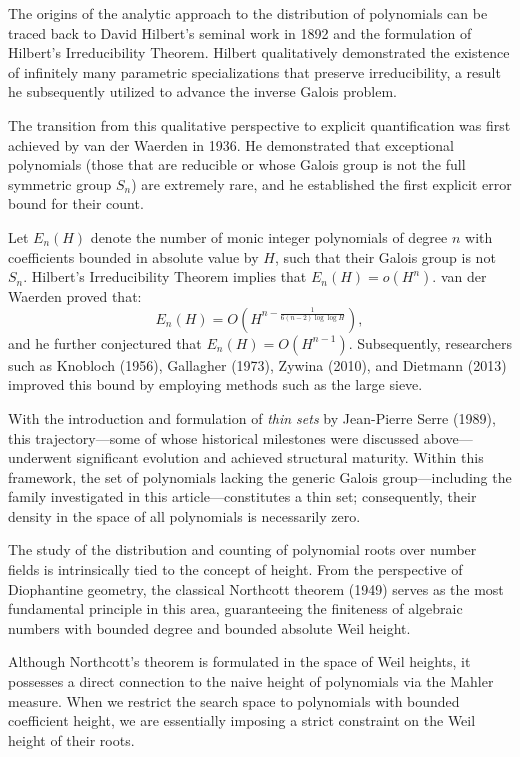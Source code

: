 \documentclass[11pt,a4paper]{article}
\begin{document}
The origins of the analytic approach to the distribution of polynomials can be traced back to David Hilbert's seminal work in 1892 and the formulation of Hilbert's Irreducibility Theorem. Hilbert qualitatively demonstrated the existence of infinitely many parametric specializations that preserve irreducibility, a result he subsequently utilized to advance the inverse Galois problem.

The transition from this qualitative perspective to explicit quantification was first achieved by van der Waerden in 1936. He demonstrated that exceptional polynomials (those that are reducible or whose Galois group is not the full symmetric group $S_n$) are extremely rare, and he established the first explicit error bound for their count.

Let $E_n(H)$ denote the number of monic integer polynomials of degree $n$ with coefficients bounded in absolute value by $H$, such that their Galois group is not $S_n$. Hilbert's Irreducibility Theorem implies that $E_n(H) = o(H^n)$. van der Waerden proved that:
\begin{equation*}
    E_n(H) = O\left( H^{n - \frac{1}{6(n-2)\log\log H}} \right),
\end{equation*}
and he further conjectured that $E_n(H) = O(H^{n-1})$. Subsequently, researchers such as Knobloch (1956), Gallagher (1973), Zywina (2010), and Dietmann (2013) improved this bound by employing methods such as the large sieve.

With the introduction and formulation of \textit{thin sets} by Jean-Pierre Serre (1989), this trajectory---some of whose historical milestones were discussed above---underwent significant evolution and achieved structural maturity. Within this framework, the set of polynomials lacking the generic Galois group---including the family investigated in this article---constitutes a thin set; consequently, their density in the space of all polynomials is necessarily zero.

The study of the distribution and counting of polynomial roots over number fields is intrinsically tied to the concept of height. From the perspective of Diophantine geometry, the classical Northcott theorem (1949) serves as the most fundamental principle in this area, guaranteeing the finiteness of algebraic numbers with bounded degree and bounded absolute Weil height.

Although Northcott's theorem is formulated in the space of Weil heights, it possesses a direct connection to the naive height of polynomials via the Mahler measure. When we restrict the search space to polynomials with bounded coefficient height, we are essentially imposing a strict constraint on the Weil height of their roots.
\end{document}
